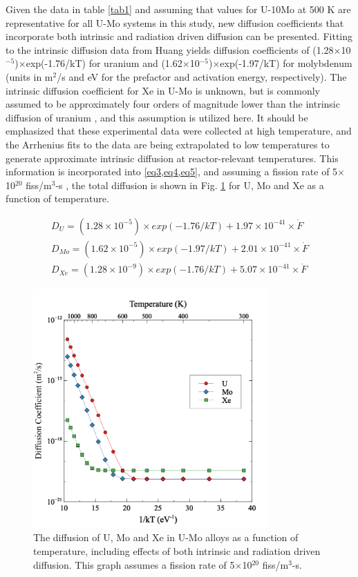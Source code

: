 \documentclass[review]{elsarticle}
\begin{document}
Given the data in table \ref{tab1} and assuming that values for U-10Mo at 500 K are representative for all U-Mo systems in this study, new diffusion coefficients that incorporate both intrinsic and radiation driven diffusion can be presented. Fitting to the intrinsic diffusion data from Huang \cite{huang2013} yields diffusion coefficients of (1.28$\times$10$^{-5}$)$\times$exp(-1.76/kT) for uranium and (1.62$\times$10$^{-5}$)$\times$exp(-1.97/kT) for molybdenum (units in m$^2$/s and eV for the prefactor and activation energy, respectively). The intrinsic diffusion coefficient for Xe in U-Mo is unknown, but is commonly assumed to be approximately four orders of magnitude lower than the intrinsic diffusion of uranium \cite{hu2016a, ushprr17, ushprr18}, and this assumption is utilized here. It should be emphasized that these experimental data were collected at high temperature, and the Arrhenius fits to the data are being extrapolated to low temperatures to generate approximate intrinsic diffusion at reactor-relevant temperatures. This information is incorporated into \cref{eq3,eq4,eq5}, and assuming a fission rate of 5$\times$10$^{20}$ fiss/m$^3$-s \cite{ushprr17, ushprr18}, the total diffusion is shown in Fig. \ref{fig:totaldiff} for U, Mo and Xe as a function of temperature. 

\begin{align}
 D_U = (1.28\times10^{-5})\times exp(-1.76/kT) + 1.97\times10^{-41} \times \dot{F} \label{eq3} \\
 D_{Mo} = (1.62\times10^{-5})\times exp(-1.97/kT) + 2.01\times10^{-41} \times \dot{F} \label{eq4} \\
 D_{Xe} = (1.28\times10^{-9})\times exp(-1.76/kT) + 5.07\times10^{-41} \times \dot{F} \label{eq5}
\end{align}

\begin{figure}[h]
 \centering
 \includegraphics[width=0.8\textwidth]{8_total_diff.png} 
 \caption{The diffusion of U, Mo and Xe in U-Mo alloys as a function of temperature, including effects of both intrinsic and radiation driven diffusion. This graph assumes a fission rate of 5$\times$10$^{20}$ fiss/m$^3$-s.}
 \label{fig:totaldiff}
\end{figure}
\end{document}
